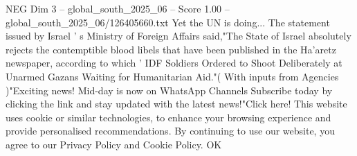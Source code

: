 \begin{textsample}{NEG Dim 3 – global\_south\_2025\_06 – Score 1.00 – global\_south\_2025\_06/126405660.txt}
Yet the UN is doing...
The statement issued by Israel ' s Ministry of Foreign Affairs said,"The State of Israel absolutely rejects the contemptible blood libels that have been published in the Ha'aretz newspaper, according to which ' IDF Soldiers Ordered to Shoot Deliberately at Unarmed Gazans Waiting for Humanitarian Aid."( With inputs from Agencies )"Exciting news!
Mid-day is now on WhatsApp Channels Subscribe today by clicking the link and stay updated with the latest news!"Click here!
This website uses cookie or similar technologies, to enhance your browsing experience and provide personalised recommendations.
By continuing to use our website, you agree to our Privacy Policy and Cookie Policy.
OK

\end{textsample}
